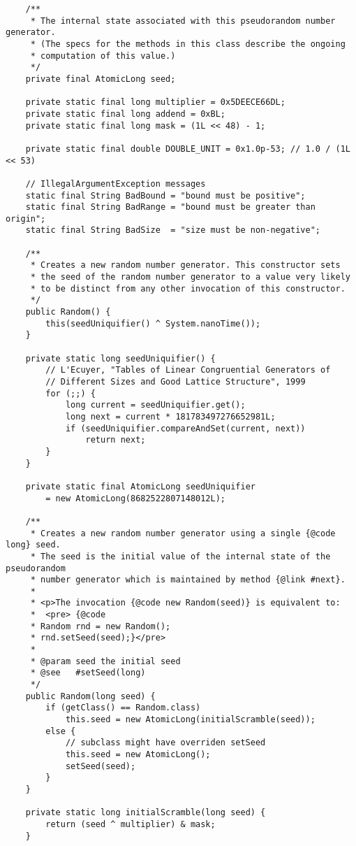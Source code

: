 \documentclass[12pt,a4paper,twoside,openright,titlepage,final]{article}
\begin{document}
\begin{verbatim}
    /**
     * The internal state associated with this pseudorandom number generator.
     * (The specs for the methods in this class describe the ongoing
     * computation of this value.)
     */
    private final AtomicLong seed;

    private static final long multiplier = 0x5DEECE66DL;
    private static final long addend = 0xBL;
    private static final long mask = (1L << 48) - 1;

    private static final double DOUBLE_UNIT = 0x1.0p-53; // 1.0 / (1L << 53)

    // IllegalArgumentException messages
    static final String BadBound = "bound must be positive";
    static final String BadRange = "bound must be greater than origin";
    static final String BadSize  = "size must be non-negative";

    /**
     * Creates a new random number generator. This constructor sets
     * the seed of the random number generator to a value very likely
     * to be distinct from any other invocation of this constructor.
     */
    public Random() {
        this(seedUniquifier() ^ System.nanoTime());
    }

    private static long seedUniquifier() {
        // L'Ecuyer, "Tables of Linear Congruential Generators of
        // Different Sizes and Good Lattice Structure", 1999
        for (;;) {
            long current = seedUniquifier.get();
            long next = current * 181783497276652981L;
            if (seedUniquifier.compareAndSet(current, next))
                return next;
        }
    }

    private static final AtomicLong seedUniquifier
        = new AtomicLong(8682522807148012L);

    /**
     * Creates a new random number generator using a single {@code long} seed.
     * The seed is the initial value of the internal state of the pseudorandom
     * number generator which is maintained by method {@link #next}.
     *
     * <p>The invocation {@code new Random(seed)} is equivalent to:
     *  <pre> {@code
     * Random rnd = new Random();
     * rnd.setSeed(seed);}</pre>
     *
     * @param seed the initial seed
     * @see   #setSeed(long)
     */
    public Random(long seed) {
        if (getClass() == Random.class)
            this.seed = new AtomicLong(initialScramble(seed));
        else {
            // subclass might have overriden setSeed
            this.seed = new AtomicLong();
            setSeed(seed);
        }
    }

    private static long initialScramble(long seed) {
        return (seed ^ multiplier) & mask;
    }


\end{verbatim}
\end{document}
